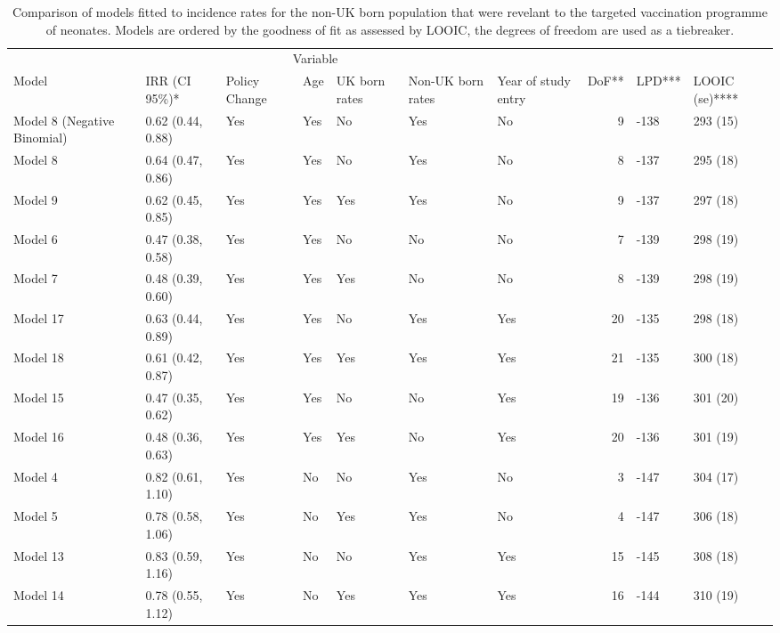 \documentclass[11pt,twoside]{bristolthesis}
\begin{document}
  \begin{landscape}\begin{table}[!h]
  
  \caption{\label{tab:07-summary-targeted-nonukborn}Comparison of models fitted to incidence rates for the non-UK born population that were revelant to the targeted vaccination programme of neonates. Models are ordered by the goodness of fit as assessed by LOOIC, the degrees of freedom are used as a tiebreaker.}
  \centering
  \fontsize{8}{10}\selectfont
  \begin{tabular}{>{\raggedright\arraybackslash}p{3cm}llllllrll}
  \toprule
  \multicolumn{2}{c}{ } & \multicolumn{5}{c}{Variable} & \multicolumn{3}{c}{ } \\
  \cmidrule(l{3pt}r{3pt}){3-7}
  Model & IRR (CI 95\%)* & Policy Change & Age & UK born rates & Non-UK born rates & Year of study entry & DoF** & LPD*** & LOOIC (se)****\\
  \midrule
  Model 8 (Negative Binomial) & 0.62 (0.44, 0.88) & Yes & Yes & No & Yes & No & 9 & -138 & 293 (15)\\
  Model 8 & 0.64 (0.47, 0.86) & Yes & Yes & No & Yes & No & 8 & -137 & 295 (18)\\
  Model 9 & 0.62 (0.45, 0.85) & Yes & Yes & Yes & Yes & No & 9 & -137 & 297 (18)\\
  Model 6 & 0.47 (0.38, 0.58) & Yes & Yes & No & No & No & 7 & -139 & 298 (19)\\
  Model 7 & 0.48 (0.39, 0.60) & Yes & Yes & Yes & No & No & 8 & -139 & 298 (19)\\
  \addlinespace
  Model 17 & 0.63 (0.44, 0.89) & Yes & Yes & No & Yes & Yes & 20 & -135 & 298 (18)\\
  Model 18 & 0.61 (0.42, 0.87) & Yes & Yes & Yes & Yes & Yes & 21 & -135 & 300 (18)\\
  Model 15 & 0.47 (0.35, 0.62) & Yes & Yes & No & No & Yes & 19 & -136 & 301 (20)\\
  Model 16 & 0.48 (0.36, 0.63) & Yes & Yes & Yes & No & Yes & 20 & -136 & 301 (19)\\
  Model 4 & 0.82 (0.61, 1.10) & Yes & No & No & Yes & No & 3 & -147 & 304 (17)\\
  \addlinespace
  Model 5 & 0.78 (0.58, 1.06) & Yes & No & Yes & Yes & No & 4 & -147 & 306 (18)\\
  Model 13 & 0.83 (0.59, 1.16) & Yes & No & No & Yes & Yes & 15 & -145 & 308 (18)\\
  Model 14 & 0.78 (0.55, 1.12) & Yes & No & Yes & Yes & Yes & 16 & -144 & 310 (19)\\

\end{tabular}
\end{table}
\end{landscape}
\end{document}
